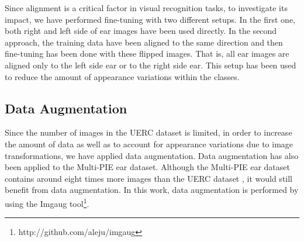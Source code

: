 \documentclass[11pt,journal,compsoc]{IEEEtran}
\begin{document}
Since alignment is a critical factor in visual recognition tasks, to investigate its impact, we have performed fine-tuning with two different setups. In the first one, both right and left side of ear images have been used directly. In the second approach, the training data have been aligned to the same direction and then fine-tuning has been done with these flipped images. That is, all ear images are aligned only to the left side ear or to the right side ear. This setup has been used to reduce the amount of appearance variations within the classes.

\subsection{Data Augmentation}\label{subsec2.3}

Since the number of images in the UERC dataset \cite{Emersic_2017_b} is limited, in order to increase the amount of data as well as to account for appearance variations due to image transformations, we have applied data augmentation.
Data augmentation has also been applied to the Multi-PIE ear dataset. Although the Multi-PIE ear dataset contains around eight times more images than the UERC dataset \cite{Emersic_2017_b}, it would still benefit from data augmentation. In this work, data augmentation is performed by using the Imgaug tool\footnote{http://github.com/aleju/imgaug}. 
\end{document}
